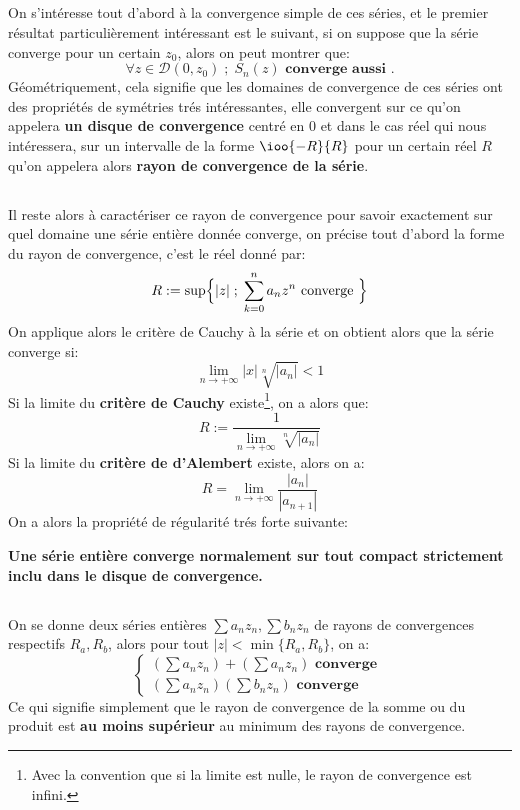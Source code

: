 \subsection*{}
On s'intéresse tout d'abord à la convergence simple de ces séries, et le premier résultat particulièrement intéressant est le suivant, si on suppose que la série converge pour un certain \(z_0\), alors on peut montrer que:
\[
   \forall z \in \mathcal{D}(0, z_0) \; ; \; S_n(z) \textbf{ converge aussi }.
\]
Géométriquement, cela signifie que les domaines de convergence de ces séries ont des propriétés de symétries trés intéressantes, elle convergent sur ce qu'on appelera \textbf{un disque de convergence} centré en \(0\) et dans le cas réel qui nous intéressera, sur un intervalle de la forme \(\ioo{-R}{R}\) pour un certain réel \(R\) qu'on appelera alors \textbf{rayon de convergence de la série}.

\subsection*{}
Il reste alors à caractériser ce rayon de convergence pour savoir exactement sur quel domaine une série entière donnée converge, on précise tout d'abord la forme du rayon de convergence, c'est le réel donné par:
\[
   R := \sup \Bigl\{ |z| \; ; \; \sum_{k=0}^{n} a_nz^n \text{ converge } \Bigl\}   
\]
On applique alors le critère de Cauchy à la série et on obtient alors que la série converge si:
\[
   \lim_{n \rightarrow +\infty}|x|\sqrt[n]{|a_n|} < 1
\]
Si la limite du \textbf{critère de Cauchy} existe\footnote[2]{Avec la convention que si la limite est nulle, le rayon de convergence est infini.}, on a alors que:
\[
   R := \frac{1}{\lim_{n \rightarrow +\infty}\sqrt[n]{|a_n|}}   
\]
Si la limite du \textbf{critère de d'Alembert} existe, alors on a:
\[
   R = \lim_{n \rightarrow +\infty}\frac{|a_n|}{|a_{n+1}|}
\]
On a alors la propriété de régularité trés forte suivante:
\begin{center}
   \textbf{Une série entière converge normalement sur tout compact strictement inclu dans le disque de convergence.}
\end{center}
\subsection*{}
On se donne deux séries entières \(\sum a_nz_n, \sum b_nz_n\) de rayons de convergences respectifs \(R_a, R_b\), alors pour tout \(|z| < \min\{R_a, R_b\}\), on a:
\[
   \begin{cases}
      \left(\sum a_nz_n\right) + \left(\sum a_nz_n\right) \textbf{ converge }\\
      \left(\sum a_nz_n\right)\left(\sum b_nz_n\right) \textbf{ converge }
   \end{cases}
\]
Ce qui signifie simplement que le rayon de convergence de la somme ou du produit est \textbf{au moins supérieur} au minimum des rayons de convergence.

